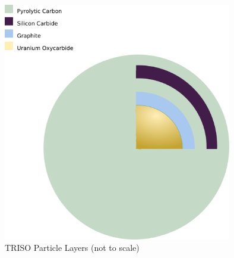 \begin{figure}[h!]
\centering
\includegraphics[width = 10cm]{figures/trisos-r-like-onions.png}
\caption{TRISO Particle Layers (not to scale)}
\label{fig:particle-layer}
\end{figure}
